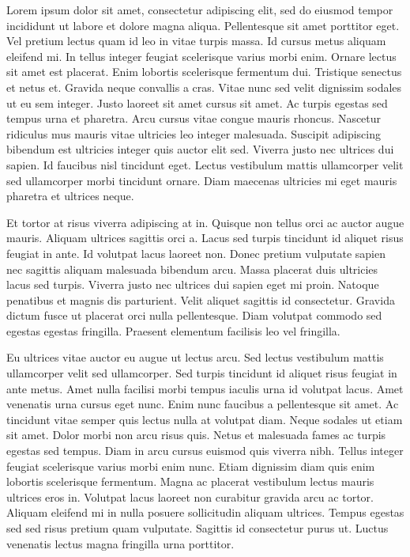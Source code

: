 Lorem ipsum dolor sit amet, consectetur adipiscing elit, sed do eiusmod tempor incididunt ut labore et dolore magna aliqua. Pellentesque sit amet porttitor eget. Vel pretium lectus quam id leo in vitae turpis massa. Id cursus metus aliquam eleifend mi. In tellus integer feugiat scelerisque varius morbi enim. Ornare lectus sit amet est placerat. Enim lobortis scelerisque fermentum dui. Tristique senectus et netus et. Gravida neque convallis a cras. Vitae nunc sed velit dignissim sodales ut eu sem integer. Justo laoreet sit amet cursus sit amet. Ac turpis egestas sed tempus urna et pharetra. Arcu cursus vitae congue mauris rhoncus. Nascetur ridiculus mus mauris vitae ultricies leo integer malesuada. Suscipit adipiscing bibendum est ultricies integer quis auctor elit sed. Viverra justo nec ultrices dui sapien. Id faucibus nisl tincidunt eget. Lectus vestibulum mattis ullamcorper velit sed ullamcorper morbi tincidunt ornare. Diam maecenas ultricies mi eget mauris pharetra et ultrices neque.

Et tortor at risus viverra adipiscing at in. Quisque non tellus orci ac auctor augue mauris. Aliquam ultrices sagittis orci a. Lacus sed turpis tincidunt id aliquet risus feugiat in ante. Id volutpat lacus laoreet non. Donec pretium vulputate sapien nec sagittis aliquam malesuada bibendum arcu. Massa placerat duis ultricies lacus sed turpis. Viverra justo nec ultrices dui sapien eget mi proin. Natoque penatibus et magnis dis parturient. Velit aliquet sagittis id consectetur. Gravida dictum fusce ut placerat orci nulla pellentesque. Diam volutpat commodo sed egestas egestas fringilla. Praesent elementum facilisis leo vel fringilla.

Eu ultrices vitae auctor eu augue ut lectus arcu. Sed lectus vestibulum mattis ullamcorper velit sed ullamcorper. Sed turpis tincidunt id aliquet risus feugiat in ante metus. Amet nulla facilisi morbi tempus iaculis urna id volutpat lacus. Amet venenatis urna cursus eget nunc. Enim nunc faucibus a pellentesque sit amet. Ac tincidunt vitae semper quis lectus nulla at volutpat diam. Neque sodales ut etiam sit amet. Dolor morbi non arcu risus quis. Netus et malesuada fames ac turpis egestas sed tempus. Diam in arcu cursus euismod quis viverra nibh. Tellus integer feugiat scelerisque varius morbi enim nunc. Etiam dignissim diam quis enim lobortis scelerisque fermentum. Magna ac placerat vestibulum lectus mauris ultrices eros in. Volutpat lacus laoreet non curabitur gravida arcu ac tortor. Aliquam eleifend mi in nulla posuere sollicitudin aliquam ultrices. Tempus egestas sed sed risus pretium quam vulputate. Sagittis id consectetur purus ut. Luctus venenatis lectus magna fringilla urna porttitor.

